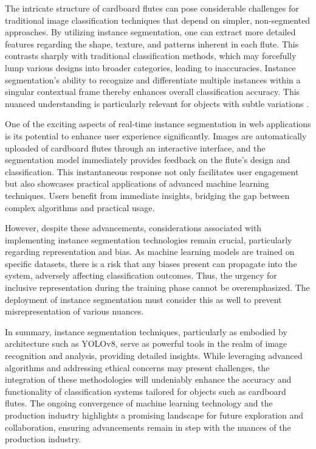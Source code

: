 The intricate structure of cardboard flutes can pose considerable challenges for traditional image classification techniques that depend on simpler, non-segmented approaches. By utilizing instance segmentation, one can extract more detailed features regarding the shape, texture, and patterns inherent in each flute. This contrasts sharply with traditional classification methods, which may forcefully lump various designs into broader categories, leading to inaccuracies. Instance segmentation's ability to recognize and differentiate multiple instances within a singular contextual frame thereby enhances overall classification accuracy. This nuanced understanding is particularly relevant for objects with subtle variations \cite{lin2014coco}.




One of the exciting aspects of real-time instance segmentation in web applications is its potential to enhance user experience significantly. Images are automatically uploaded of cardboard flutes through an interactive interface, and the segmentation model immediately provides feedback on the flute's design and classification. This instantaneous response not only facilitates user engagement but also showcases practical applications of advanced machine learning techniques. Users benefit from immediate insights, bridging the gap between complex algorithms and practical usage.


However, despite these advancements, considerations associated with implementing instance segmentation technologies remain crucial, particularly regarding representation and bias. As machine learning models are trained on specific datasets, there is a risk that any biases present can propagate into the system, adversely affecting classification outcomes. Thus, the urgency for inclusive representation during the training phase cannot be overemphasized. The deployment of instance segmentation must consider this as well to prevent misrepresentation of various nuances.


In summary, instance segmentation techniques, particularly as embodied by architecture such as YOLOv8, serve as powerful tools in the realm of image recognition and analysis, providing detailed insights. While leveraging advanced algorithms and addressing ethical concerns may present challenges, the integration of these methodologies will undeniably enhance the accuracy and functionality of classification systems tailored for objects such as cardboard flutes. The ongoing convergence of machine learning technology and the production industry highlights a promising landscape for future exploration and collaboration, ensuring advancements remain in step with the nuances of the production industry.




